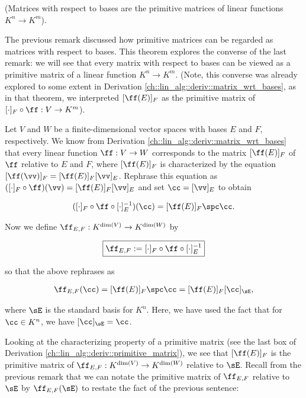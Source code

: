\begin{theorem}
\label{ch::lin_alg::thm::f_EF}

    (Matrices with respect to bases are the primitive matrices of linear functions $K^n \rightarrow K^m$).
    
    The previous remark discussed how primitive matrices can be regarded as matrices with respect to bases. This theorem explores the converse of the last remark: we will see that every matrix with respect to bases can be viewed as a primitive matrix of a linear function $K^n \rightarrow K^m$. (Note, this converse was already explored to some extent in Derivation \ref{ch::lin_alg::deriv::matrix_wrt_bases}, as in that theorem, we interpreted $[\ff(E)]_F$ as the primitive matrix of $[\cdot]_F \circ \ff:V \rightarrow K^m$).
    
    Let $V$ and $W$ be a finite-dimensional vector spaces with bases $E$ and $F$, respectively. We know from Derivation \ref{ch::lin_alg::deriv::matrix_wrt_bases} that every linear function $\ff:V \rightarrow W$ corresponds to the matrix $[\ff(E)]_F$ of $\ff$ relative to $E$ and $F$, where $[\ff(E)]_F$ is characterized by the equation $[\ff(\vv)]_F = [\ff(E)]_F [\vv]_E$. Rephrase this equation as $([\cdot]_F \circ \ff)(\vv) = [\ff(E)]_F [\vv]_E$ and set $\cc = [\vv]_E$ to obtain
    
    \begin{align*}
        ([\cdot]_F \circ \ff \circ [\cdot]_E^{-1})(\cc) = [\ff(E)]_F \spc \cc.
    \end{align*}
    
    Now we define $\ff_{E,F}:K^{\dim(V)} \rightarrow K^{\dim(W)}$ by
    
    \begin{align*}
        \boxed
        {
            \ff_{E,F} := [\cdot]_F \circ \ff \circ [\cdot]_E^{-1}
        }
    \end{align*}

    so that the above rephrases as
    
    \begin{align*}
        \ff_{E,F}(\cc) = [\ff(E)]_F \spc \cc = [\ff(E)]_F [\cc]_\sE,
    \end{align*}
    
    where $\sE$ is the standard basis for $K^n$. Here, we have used the fact that for $\cc \in K^n$, we have $[\cc]_\sE = \cc$.
    
    Looking at the characterizing property of a primitive matrix (see the last box of Derivation \ref{ch::lin_alg::deriv::primitive_matrix}), we see that $[\ff(E)]_F$ is the primitive matrix of $\ff_{E,F}:K^{\dim(V)} \rightarrow K^{\dim(W)}$ relative to $\sE$. Recall from the previous remark that we can notate the primitive matrix of $\ff_{E,F}$ relative to $\sE$ by $\ff_{E,F}(\sE)$ to restate the fact of the previous sentence:
    

\end{theorem}

